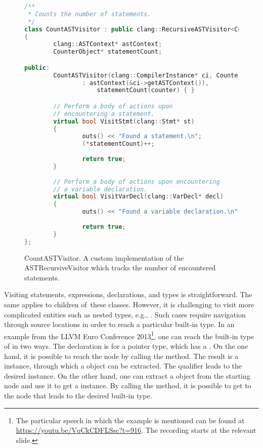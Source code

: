 \begin{figure}[ht]\centering
\begin{lstlisting}[language=C++]
/**
 * Counts the number of statements.
 */
class CountASTVisitor : public clang::RecursiveASTVisitor<CountASTVisitor>
{
        clang::ASTContext* astContext;
        CounterObject* statementCount;

public:
        CountASTVisitor(clang::CompilerInstance* ci, CounterObject* counter)
                : astContext(&ci->getASTContext()), 
					statementCount(counter) { }

		// Perform a body of actions upon 
		// encountering a statement.
        virtual bool VisitStmt(clang::Stmt* st)
        {
                outs() << "Found a statement.\n";
				(*statementCount)++;
				
                return true;
        }
		
		// Perform a body of actions upon encountering 
		// a variable declaration.
		virtual bool VisitVarDecl(clang::VarDecl* decl)
        {
                outs() << "Found a variable declaration.\n";
				
                return true;
        }
};
\end{lstlisting}
\caption{CountASTVisitor. A custom implementation of the ASTRecursiveVisitor
which tracks the number of encountered statements.}
\label{lst:countvisitor}
\end{figure}

Visiting statements, expressions, declarations, 
and types is straightforward. 
The same applies to children of~these classes. 
However, it is challenging to visit more complicated entities 
such as nested types, e.g., . 
Such cases require navigation through source locations in order to reach 
a particular built-in type.
In an example from the LLVM Euro Conference 2013\footnote{The particular 
speech in which the example is mentioned can be found 
at \url{https://youtu.be/VqCkCDFLSsc?t=916}. The recording starts at
the relevant slide.}, 
one can reach the built-in type of  in two ways. 
The declaration is for a pointer type, which has a . 
On the one hand, it is possible to reach the  node by 
calling the  method. 
The result is a  instance, through which 
a  object can be extracted. 
The qualifier leads to the desired  instance. 
On the other hand, one can extract a  object from 
the starting  node and use it to get 
a  instance. 
By calling the  method, it is possible to get to 
the  node that leads to the desired built-in type. 

